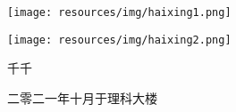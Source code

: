 \newpage
{\kaishu
  \begin{center}
    \LARGE\bfseries{}
  \end{center}

  \centering
  \texttt{[image: resources/img/haixing1.png]}
  
  \centering
  \texttt{[image: resources/img/haixing2.png]}

  \vspace{1cm} \hspace{9.8cm}  千千

  \hspace{8cm}
} 二零二一年十月于理科大楼